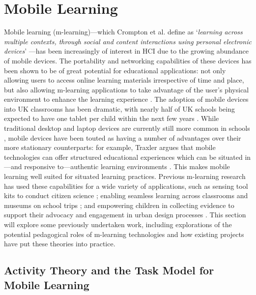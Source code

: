 \section{Mobile Learning}
Mobile learning (m-learning)—which Crompton et al. define as `\textit{learning across multiple contexts, through social and content interactions using personal electronic devices}' \citep{Crompton2013}—has been increasingly of interest in HCI due to the growing abundance of mobile devices. The portability and networking capabilities of these devices has been shown to be of great potential for educational applications: not only allowing users to access online learning materials irrespective of time and place, but also allowing m-learning applications to take advantage of the user’s physical environment to enhance the learning experience \citep{Frohberg2009}. The adoption of mobile devices into UK classrooms has been dramatic, with nearly half of UK schools being expected to have one tablet per child within the next few years \citep{BritishEducationalSuppliersAssociation2015}. While traditional desktop and laptop devices are currently still more common in schools \citep{BritishEducationalSuppliersAssociation2017}, mobile devices have been touted as having a number of advantages over their more stationary counterparts: for example, Traxler argues that mobile technologies can offer structured educational experiences which can be situated in---and responsive to---authentic learning environments \citep{Traxler2011}. This makes mobile learning well suited for situated learning practices. Previous m-learning research has used these capabilities for a wide variety of applications, such as sensing tool kits to conduct citizen science \citep{Sharples2017}; enabling seamless learning across classrooms and museums on school trips \citep{Vavoula2009}; and empowering children in collecting evidence to support their advocacy and engagement in urban design processes \citep{Peacock2018}. This section will explore some previously undertaken work, including explorations of the potential pedagogical roles of m-learning technologies and how existing projects have put these theories into practice.

\subsection{Activity Theory and the Task Model for Mobile Learning}
\label{sec:ActivityTheory}

